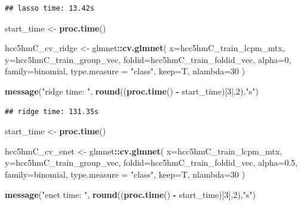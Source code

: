 \documentclass[
]{book}
\newenvironment{Shaded}{\begin{snugshade}}{\end{snugshade}}
\newcommand{\DataTypeTok}[1]{\textcolor[rgb]{0.13,0.29,0.53}{#1}}
\newcommand{\DecValTok}[1]{\textcolor[rgb]{0.00,0.00,0.81}{#1}}
\newcommand{\FloatTok}[1]{\textcolor[rgb]{0.00,0.00,0.81}{#1}}
\newcommand{\KeywordTok}[1]{\textcolor[rgb]{0.13,0.29,0.53}{\textbf{#1}}}
\newcommand{\NormalTok}[1]{#1}
\newcommand{\OperatorTok}[1]{\textcolor[rgb]{0.81,0.36,0.00}{\textbf{#1}}}
\newcommand{\StringTok}[1]{\textcolor[rgb]{0.31,0.60,0.02}{#1}}
\begin{document}
\begin{verbatim}
## lasso time: 13.42s
\end{verbatim}

\begin{Shaded}
\begin{Highlighting}[]
\NormalTok{start\_time <{-}}\StringTok{  }\KeywordTok{proc.time}\NormalTok{()}

\NormalTok{hcc5hmC\_cv\_ridge <{-}}\StringTok{ }\NormalTok{glmnet}\OperatorTok{::}\KeywordTok{cv.glmnet}\NormalTok{(}
 \DataTypeTok{x=}\NormalTok{hcc5hmC\_train\_lcpm\_mtx,}
 \DataTypeTok{y=}\NormalTok{hcc5hmC\_train\_group\_vec,}
 \DataTypeTok{foldid=}\NormalTok{hcc5hmC\_train\_foldid\_vec,}
 \DataTypeTok{alpha=}\DecValTok{0}\NormalTok{,}
 \DataTypeTok{family=}\StringTok{\textquotesingle{}binomial\textquotesingle{}}\NormalTok{, }
 \DataTypeTok{type.measure =} \StringTok{"class"}\NormalTok{,}
 \DataTypeTok{keep=}\NormalTok{T,}
 \DataTypeTok{nlambda=}\DecValTok{30}
\NormalTok{)}

\KeywordTok{message}\NormalTok{(}\StringTok{"ridge time: "}\NormalTok{, }\KeywordTok{round}\NormalTok{((}\KeywordTok{proc.time}\NormalTok{() }\OperatorTok{{-}}\StringTok{ }\NormalTok{start\_time)[}\DecValTok{3}\NormalTok{],}\DecValTok{2}\NormalTok{),}\StringTok{"s"}\NormalTok{)}
\end{Highlighting}
\end{Shaded}

\begin{verbatim}
## ridge time: 131.35s
\end{verbatim}

\begin{Shaded}
\begin{Highlighting}[]
\NormalTok{start\_time <{-}}\StringTok{  }\KeywordTok{proc.time}\NormalTok{()}

\NormalTok{hcc5hmC\_cv\_enet <{-}}\StringTok{ }\NormalTok{glmnet}\OperatorTok{::}\KeywordTok{cv.glmnet}\NormalTok{(}
 \DataTypeTok{x=}\NormalTok{hcc5hmC\_train\_lcpm\_mtx,}
 \DataTypeTok{y=}\NormalTok{hcc5hmC\_train\_group\_vec,}
 \DataTypeTok{foldid=}\NormalTok{hcc5hmC\_train\_foldid\_vec,}
 \DataTypeTok{alpha=}\FloatTok{0.5}\NormalTok{,}
 \DataTypeTok{family=}\StringTok{\textquotesingle{}binomial\textquotesingle{}}\NormalTok{,}
 \DataTypeTok{type.measure =} \StringTok{"class"}\NormalTok{,}
 \DataTypeTok{keep=}\NormalTok{T,}
 \DataTypeTok{nlambda=}\DecValTok{30}
\NormalTok{)}

\KeywordTok{message}\NormalTok{(}\StringTok{"enet time: "}\NormalTok{, }\KeywordTok{round}\NormalTok{((}\KeywordTok{proc.time}\NormalTok{() }\OperatorTok{{-}}\StringTok{ }\NormalTok{start\_time)[}\DecValTok{3}\NormalTok{],}\DecValTok{2}\NormalTok{),}\StringTok{"s"}\NormalTok{)}
\end{Highlighting}
\end{Shaded}
\end{document}
